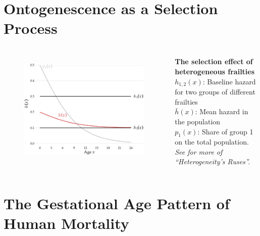 \documentclass{beamer}
\begin{document}
\section{Ontogenescence as a Selection Process} %

\begin{frame}
\frametitle{\insertsection}

\begin{columns}[c]

\begin{figure}[htb!]
\includegraphics[width = \textwidth]{./fig/plot-binary.pdf}\\
\end{figure}

\footnotesize\textbf{The selection effect of heterogeneous frailties}\\
$h_{1,2}(x)$: Baseline hazard for two groups of different frailties\\
$\bar{h}(x)$: Mean hazard in the population\\
$p_1(x)$: Share of group 1 on the total population. \\ \scriptsize\emph{See \cite{Vaupel1985} for more of \enquote{Heterogeneity's Ruses}.}

\end{columns}

\end{frame}

\section{The Gestational Age Pattern of Human Mortality} %
\end{document}
